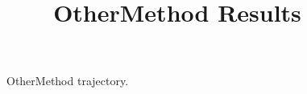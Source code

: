 \documentclass{article}
\title{OtherMethod Results}
\begin{document}
\begin{figure}
\caption{OtherMethod trajectory.}
\end{figure}
\end{document}
